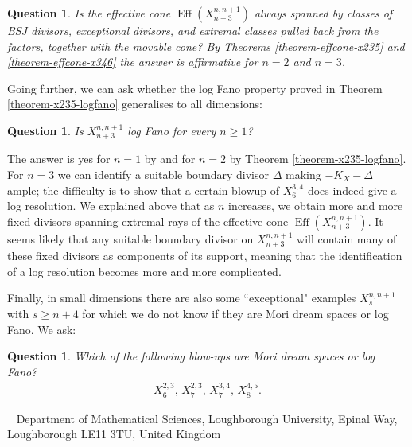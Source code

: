 \documentclass[a4paper,11pt]{article}
\newtheorem{question}[theorem]{Question}
\newcommand{\Eff}{\operatorname{Eff}}
\begin{document}
\begin{question}
Is the effective cone $\Eff(X^{n,n+1}_{n+3})$ always spanned by classes of BSJ divisors, exceptional divisors, and extremal classes pulled back from the factors, together with the movable cone? By Theorems \ref{theorem-effcone-x235} and \ref{theorem-effcone-x346} the answer is affirmative for $n=2$ and $n=3$. 
\end{question}

Going further, we can ask whether the log Fano property proved in Theorem \ref{theorem-x235-logfano} generalises to all dimensions:
\begin{question}
    Is $X^{n,n+1}_{n+3}$ log Fano for every $n \geq 1$?
\end{question}
The answer is yes for $n=1$ by \cite[Theorem 6.10]{GPP21} and for $n=2$ by Theorem \ref{theorem-x235-logfano}. For $n=3$ we can identify a suitable boundary divisor $\Delta$ making $-K_X-\Delta$ ample; the difficulty is to show that a certain blowup of $X^{3,4}_6$ does indeed give a log resolution. We explained above that as $n$ increases, we obtain more and more fixed divisors spanning extremal rays of the effective cone $\Eff(X^{n,n+1}_{n+3})$. It seems likely that any suitable boundary divisor on $X^{n,n+1}_{n+3}$ will contain many of these fixed divisors as components of its support, meaning that the identification of a log resolution becomes more and more complicated. 

Finally, in small dimensions there are also some ``exceptional" examples $X^{n,n+1}_s$ with $s\geq n+4$ for which we do not know if they are Mori dream spaces or log Fano. We ask:
\begin{question}\label{question-LF-smalldim} 
Which of the following blow-ups are Mori dream spaces or log Fano?
\begin{align*}
X^{2,3}_6, \, X^{2,3}_7, \, X^{3,4}_7, \, X^{4,5}_8.    
\end{align*}
\end{question}





{\small
  {\sc 
{}

~\newline
    Department of Mathematical Sciences, Loughborough University, Epinal Way, Loughborough LE11 3TU, United Kingdom}

}
\end{document}
